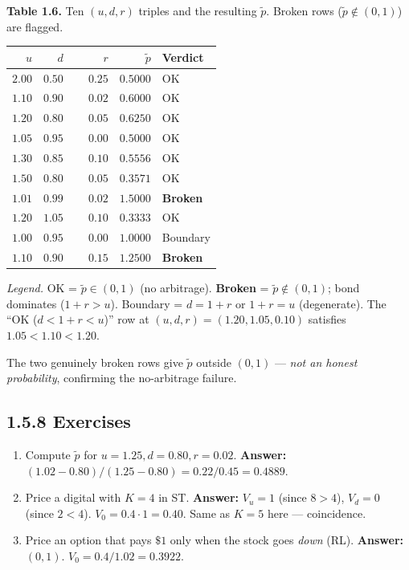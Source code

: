 \documentclass[
  10pt,
  twoside]{book}
\newcounter{none} %
\providecommand{\tightlist}{%
  \setlength{\itemsep}{0pt}\setlength{\parskip}{0pt}}
\begin{document}
\textbf{Table 1.6.} Ten \((u,d,r)\) triples and the resulting
\(\tilde p\). Broken rows (\(\tilde p\notin (0,1)\)) are flagged.

{\def\LTcaptype{none} %
\begin{table}[H]
\centering
\begin{tabular}{|r|r|r|r|l|}
\toprule
\(u\) & \(d\) & \(r\) & \(\tilde p\) & Verdict \\
\midrule



\(2.00\) & \(0.50\) & \(\phantom{-}0.25\) & \(0.5000\) & OK \\
\(1.10\) & \(0.90\) & \(\phantom{-}0.02\) & \(0.6000\) & OK \\
\(1.20\) & \(0.80\) & \(\phantom{-}0.05\) & \(0.6250\) & OK \\
\(1.05\) & \(0.95\) & \(\phantom{-}0.00\) & \(0.5000\) & OK \\
\(1.30\) & \(0.85\) & \(\phantom{-}0.10\) & \(0.5556\) & OK \\
\(1.50\) & \(0.80\) & \(\phantom{-}0.05\) & \(0.3571\) & OK \\
\(1.01\) & \(0.99\) & \(\phantom{-}0.02\) & \(1.5000\) &
\textbf{Broken} \\
\(1.20\) & \(1.05\) & \(\phantom{-}0.10\) & \(0.3333\) & OK \\
\(1.00\) & \(0.95\) & \(\phantom{-}0.00\) & \(1.0000\) & Boundary \\
\(1.10\) & \(0.90\) & \(\phantom{-}0.15\) & \(1.2500\) &
\textbf{Broken} \\
\bottomrule
\end{tabular}
\end{table}
}

\emph{Legend.} OK = \(\tilde p\in(0,1)\) (no arbitrage). \textbf{Broken}
= \(\tilde p\notin(0,1)\); bond dominates (\(1+r>u\)). Boundary =
\(d=1+r\) or \(1+r=u\) (degenerate). The ``OK (\(d<1+r<u\))'' row at
\((u,d,r)=(1.20,1.05,0.10)\) satisfies \(1.05<1.10<1.20\).

The two genuinely broken rows give \(\tilde p\) outside \((0,1)\) ---
\emph{not an honest probability}, confirming the no-arbitrage failure.

\subsection{1.5.8 Exercises}\label{exercises-15}

\begin{enumerate}
\def\labelenumi{\arabic{enumi}.}
\tightlist
\item
  Compute \(\tilde p\) for \(u=1.25, d=0.80, r=0.02\). \textbf{Answer:}
  \((1.02-0.80)/(1.25-0.80)=0.22/0.45=0.4889\).
\item
  Price a digital with \(K=4\) in ST. \textbf{Answer:} \(V_u=1\) (since
  \(8>4\)), \(V_d=0\) (since \(2<4\)). \(V_0=0.4\cdot 1=0.40\). Same as
  \(K=5\) here --- coincidence.
\item
  Price an option that pays \(\$1\) only when the stock goes \emph{down}
  (RL). \textbf{Answer:} \((0,1)\). \(V_0=0.4/1.02=0.3922\).
\end{enumerate}
\end{document}
